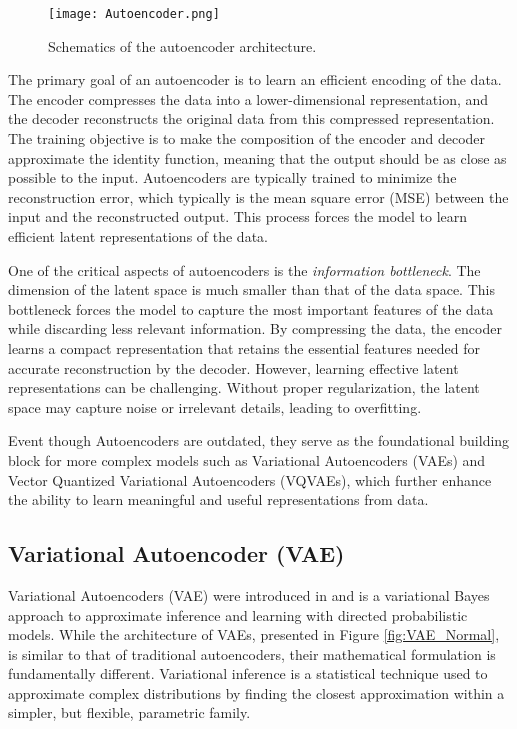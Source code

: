 \documentclass[../../thesis.tex]{subfiles}
\begin{document}
\begin{figure}[h]
    \texttt{[image: Autoencoder.png]}
    \centering
    \caption{Schematics of the autoencoder architecture.}
    \label{fig:autoencoder}
\end{figure}

The primary goal of an autoencoder is to learn an efficient encoding of the data. The encoder compresses the data into a lower-dimensional representation, and the decoder reconstructs the original data from this compressed representation. The training objective is to make the composition of the encoder and decoder approximate the identity function, meaning that the output should be as close as possible to the input. Autoencoders are typically trained to minimize the reconstruction error, which typically is the mean square error (MSE) between the input and the reconstructed output. This process forces the model to learn efficient latent representations of the data.\newline

One of the critical aspects of autoencoders is the \textit{information bottleneck}. The dimension of the latent space is much smaller than that of the data space. This bottleneck forces the model to capture the most important features of the data while discarding less relevant information. By compressing the data, the encoder learns a compact representation that retains the essential features needed for accurate reconstruction by the decoder. However, learning effective latent representations can be challenging. Without proper regularization, the latent space may capture noise or irrelevant details, leading to overfitting.\newline

Event though Autoencoders are outdated, they serve as the foundational building block for more complex models such as Variational Autoencoders (VAEs) and Vector Quantized Variational Autoencoders (VQVAEs), which further enhance the ability to learn meaningful and useful representations from data.

\subsection{Variational Autoencoder (VAE)}
Variational Autoencoders (VAE) were introduced in \cite{kingma2022autoencoding} and is a variational Bayes approach to approximate inference and learning with directed probabilistic models. While the architecture of VAEs, presented in Figure \ref{fig:VAE_Normal}, is similar to that of traditional autoencoders, their mathematical formulation is fundamentally different. Variational inference is a statistical technique used to approximate complex distributions by finding the closest approximation within a simpler, but flexible, parametric family. \newline 
\end{document}
